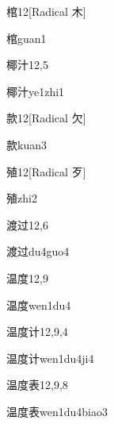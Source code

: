 \begin{entry}{棺}{12}[Radical ⽊]
  \begin{phonetics}{棺}{guan1}
  \end{phonetics}
\end{entry}

\begin{entry}{椰汁}{12,5}
  \begin{phonetics}{椰汁}{ye1zhi1}
  \end{phonetics}
\end{entry}

\begin{entry}{款}{12}[Radical 欠]
  \begin{phonetics}{款}{kuan3}
  \end{phonetics}
\end{entry}

\begin{entry}{殖}{12}[Radical 歹]
  \begin{phonetics}{殖}{zhi2}
  \end{phonetics}
\end{entry}

\begin{entry}{渡过}{12,6}
  \begin{phonetics}{渡过}{du4guo4}
  \end{phonetics}
\end{entry}

\begin{entry}{温度}{12,9}
  \begin{phonetics}{温度}{wen1du4}
  \end{phonetics}
\end{entry}

\begin{entry}{温度计}{12,9,4}
  \begin{phonetics}{温度计}{wen1du4ji4}
  \end{phonetics}
\end{entry}

\begin{entry}{温度表}{12,9,8}
  \begin{phonetics}{温度表}{wen1du4biao3}
  \end{phonetics}
\end{entry}

